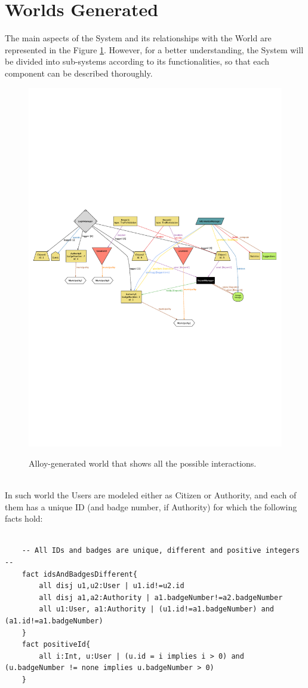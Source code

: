 \documentclass{report}
\begin{document}
\section{Worlds Generated}
The main aspects of the System and its relationships with the World are represented in the Figure \ref{fig:all-oy}. However, for a better understanding, the System will be divided into sub-systems according to its functionalities, so that each component can be described thoroughly.
\begin{figure}[ht!]
	\begin{center}
	\includegraphics[width=\textwidth]{./img/Prova.pdf}
	\label{fig:all-oy}
	\caption{Alloy-generated world that shows all the possible interactions.}
	\end{center}
\end{figure}\\
In such world the Users are modeled either as Citizen or Authority, and each of them has a unique ID (and badge number, if Authority) for which the following facts hold:
\begin{lstlisting}[language=alloy]
	
	-- All IDs and badges are unique, different and positive integers --
	fact idsAndBadgesDifferent{
		all disj u1,u2:User | u1.id!=u2.id 
		all disj a1,a2:Authority | a1.badgeNumber!=a2.badgeNumber 
		all u1:User, a1:Authority | (u1.id!=a1.badgeNumber) and (a1.id!=a1.badgeNumber)
	}
	fact positiveId{
		all i:Int, u:User | (u.id = i implies i > 0) and (u.badgeNumber != none implies u.badgeNumber > 0)
	}
\end{lstlisting}
\end{document}

